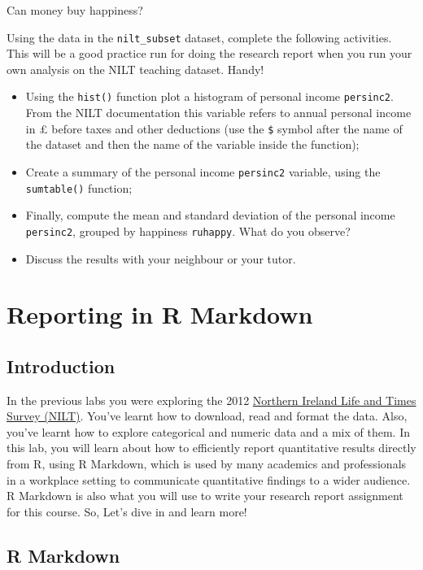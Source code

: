 \documentclass[
]{book}
\providecommand{\tightlist}{%
  \setlength{\itemsep}{0pt}\setlength{\parskip}{0pt}}
\begin{document}
Can money buy happiness?

Using the data in the \texttt{nilt\_subset} dataset, complete the following activities. This will be a good practice run for doing the research report when you run your own analysis on the NILT teaching dataset. Handy!

\begin{itemize}
\tightlist
\item
  Using the \texttt{hist()} function plot a histogram of personal income \texttt{persinc2}. From the NILT documentation this variable refers to annual personal income in £ before taxes and other deductions (use the \texttt{\$} symbol after the name of the dataset and then the name of the variable inside the function);
\item
  Create a summary of the personal income \texttt{persinc2} variable, using the \texttt{sumtable()} function;
\item
  Finally, compute the mean and standard deviation of the personal income \texttt{persinc2}, grouped by happiness \texttt{ruhappy}. What do you observe?
\item
  Discuss the results with your neighbour or your tutor.
\end{itemize}

\hypertarget{reporting-in-r-markdown}{%
\chapter{Reporting in R Markdown}\label{reporting-in-r-markdown}}

\hypertarget{introduction}{%
\section{Introduction}\label{introduction}}

In the previous labs you were exploring the 2012 \href{https://www.ark.ac.uk/nilt/}{Northern Ireland Life and Times Survey (NILT)}. You've learnt how to download, read and format the data. Also, you've learnt how to explore categorical and numeric data and a mix of them. In this lab, you will learn about how to efficiently report quantitative results directly from R, using R Markdown, which is used by many academics and professionals in a workplace setting to communicate quantitative findings to a wider audience. R Markdown is also what you will use to write your research report assignment for this course. So, Let's dive in and learn more!

\hypertarget{r-markdown}{%
\section{R Markdown}\label{r-markdown}}
\end{document}
